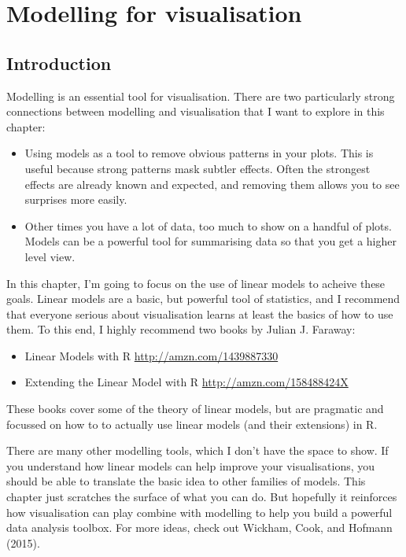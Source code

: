 \chapter{Modelling for visualisation}\label{cha:modelling}

\section{Introduction}

Modelling is an essential tool for visualisation. There are two
particularly strong connections between modelling and visualisation that
I want to explore in this chapter: 

\begin{itemize}
\item
  Using models as a tool to remove obvious patterns in your plots. This
  is useful because strong patterns mask subtler effects. Often the
  strongest effects are already known and expected, and removing them
  allows you to see surprises more easily.
\item
  Other times you have a lot of data, too much to show on a handful of
  plots.\\
   Models can be a powerful tool for summarising data so that you get a
  higher level view.
\end{itemize}

In this chapter, I'm going to focus on the use of linear models to
acheive these goals. Linear models are a basic, but powerful tool of
statistics, and I recommend that everyone serious about visualisation
learns at least the basics of how to use them. To this end, I highly
recommend two books by Julian J. Faraway:

\begin{itemize}
\tightlist
\item
  Linear Models with R \url{http://amzn.com/1439887330}
\item
  Extending the Linear Model with R \url{http://amzn.com/158488424X}
\end{itemize}

These books cover some of the theory of linear models, but are pragmatic
and focussed on how to to actually use linear models (and their
extensions) in R. 

There are many other modelling tools, which I don't have the space to
show. If you understand how linear models can help improve your
visualisations, you should be able to translate the basic idea to other
families of models. This chapter just scratches the surface of what you
can do. But hopefully it reinforces how visualisation can play combine
with modelling to help you build a powerful data analysis toolbox. For
more ideas, check out Wickham, Cook, and Hofmann (2015).

